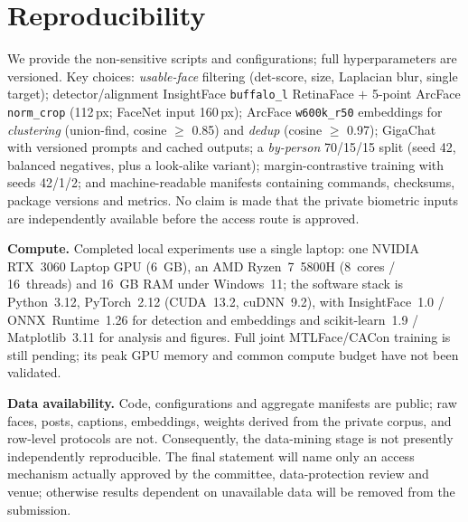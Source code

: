 \documentclass[journal]{IEEEtran}
\begin{document}
\section{Reproducibility}\label{sec:repro}
We provide the non-sensitive scripts and configurations; full hyperparameters are versioned. Key choices: \emph{usable-face} filtering (det-score, size, Laplacian blur, single target); detector/alignment InsightFace \texttt{buffalo\_l} RetinaFace $+$ 5-point ArcFace \texttt{norm\_crop} (112\,px; FaceNet input 160\,px); ArcFace \texttt{w600k\_r50} embeddings for \emph{clustering} (union-find, cosine $\geq$ 0.85) and \emph{dedup} (cosine $\geq$ 0.97); GigaChat with versioned prompts and cached outputs; a \emph{by-person} 70/15/15 split (seed 42, balanced negatives, plus a look-alike variant); margin-contrastive training with seeds 42/1/2; and machine-readable manifests containing commands, checksums, package versions and metrics. No claim is made that the private biometric inputs are independently available before the access route is approved.

\textbf{Compute.} Completed local experiments use a single laptop: one NVIDIA RTX~3060 Laptop GPU (6~GB), an AMD Ryzen~7~5800H (8~cores / 16~threads) and 16~GB RAM under Windows~11; the software stack is Python~3.12, PyTorch~2.12 (CUDA~13.2, cuDNN~9.2), with InsightFace~1.0 / ONNX~Runtime~1.26 for detection and embeddings and scikit-learn~1.9 / Matplotlib~3.11 for analysis and figures. Full joint MTLFace/CACon training is still pending; its peak GPU memory and common compute budget have not been validated.

\textbf{Data availability.} Code, configurations and aggregate manifests are public; raw faces, posts, captions, embeddings, weights derived from the private corpus, and row-level protocols are not. Consequently, the data-mining stage is not presently independently reproducible. The final statement will name only an access mechanism actually approved by the committee, data-protection review and venue; otherwise results dependent on unavailable data will be removed from the submission.
\end{document}
